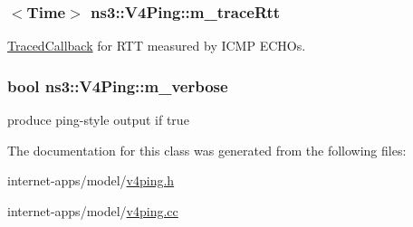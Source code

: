 \subsubsection[{\texorpdfstring{m\+\_\+trace\+Rtt}{m_traceRtt}}]{$<${\bf Time}$>$ ns3\+::\+V4\+Ping\+::m\+\_\+trace\+Rtt\hspace{0.3cm}{\ttfamily [private]}}\hypertarget{classns3_1_1V4Ping_abaf5eec819058e81e958ae3dadb8fbe2}{}\label{classns3_1_1V4Ping_abaf5eec819058e81e958ae3dadb8fbe2}


\hyperlink{classns3_1_1TracedCallback}{Traced\+Callback} for R\+TT measured by I\+C\+MP E\+C\+H\+Os. 

\subsubsection[{\texorpdfstring{m\+\_\+verbose}{m_verbose}}]{\setlength{\rightskip}{0pt plus 5cm}bool ns3\+::\+V4\+Ping\+::m\+\_\+verbose\hspace{0.3cm}{\ttfamily [private]}}\hypertarget{classns3_1_1V4Ping_a0b843e4454492e5a20860b6c624b667b}{}\label{classns3_1_1V4Ping_a0b843e4454492e5a20860b6c624b667b}


produce ping-\/style output if true 



The documentation for this class was generated from the following files\+:\begin{DoxyCompactItemize}
\item 
internet-\/apps/model/\hyperlink{v4ping_8h}{v4ping.\+h}\item 
internet-\/apps/model/\hyperlink{v4ping_8cc}{v4ping.\+cc}\end{DoxyCompactItemize}
